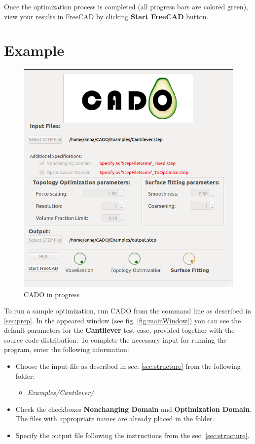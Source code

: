 \documentclass[
12pt, %
a4paper, %
oneside, %
headinclude,footinclude, %
BCOR5mm, %
]{scrartcl}
\begin{document}
Once the optimization process is completed (all progress bars are colored green), view your results in FreeCAD by clicking \textbf{Start FreeCAD} button.

\section{Example}

\begin{figure}
\centering
\includegraphics[scale=0.4]{Pictures/CADO_inProgress}
\caption{CADO in progress}
\label{fig:inProgress}
\end{figure}
To run a sample optimization, run CADO from the command line as described in \ref{sec:prep}. In the appeared window (see fig. \ref{fig:mainWindow}) you can see the default parameters for the \textbf{Cantilever} test case, provided together with the source code distribution. To complete the necessary input for running the program, enter the following information:
\begin{itemize}
\item Choose the input file as described in sec. \ref{sec:structure} from the following folder:
\begin{itemize}
\item[] \textit{Examples/Cantilever/}
\end{itemize}
\item Check the checkboxes \textbf{Nonchanging Domain} and \textbf{Optimization Domain}. The files with appropriate names are already placed in the folder.
\item Specify the output file following the instructions from the sec. \ref{sec:structure}.
\end{itemize}
\end{document}
